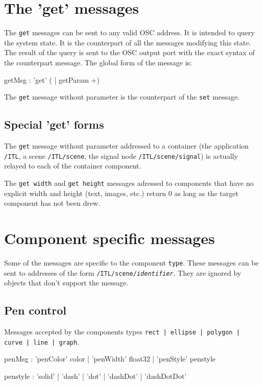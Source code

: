 \documentclass[a4paper,twoside]{report}
\newcommand{\toplevel}[1]	{\chapter{#1}}
\newcommand{\sublevel}[1]	{\section{#1}}
\newcommand{\OSC}[1]		{\texttt{#1}}
\begin{document}
\toplevel{The 'get' messages}
\label{getsect}

The \OSC{get} messages can be sent to any valid OSC address. It is intended to query the system state. It is the counterpart of all the messages modifying this state.  The result of the query is sent to the OSC output port with the exact syntax of the counterpart message. 
The global form of the message is:
\begin{rail}
getMsg : 'get' ( | getParam +)
\end{rail}

The \OSC{get} message without parameter is the counterpart of the \OSC{set} message. 

\sublevel{Special 'get' forms}

The \OSC{get} message without parameter addressed to a container (the application \OSC{/ITL}, a scene \OSC{/ITL/scene}, the signal node \OSC{/ITL/scene/signal}) is actually relayed to each of the container component.  

The \OSC{get width} and \OSC{get height} messages adressed to components that have no explicit width and height (text, images, etc.) return 0 as long as the target component has not been drew.



\toplevel{Component specific messages}
\label{specificMsg}
Some of the messages are specific to the component \OSC{type}. These messages can be sent to addresses of the form \OSC{/ITL/scene/\textit{identifier}}. They are ignored by objects that don't support the message. 

\sublevel{Pen control}

Messages accepted by the components types \OSC{rect | ellipse | polygon | curve | line | graph}.
\begin{rail}
penMsg : 	  'penColor' color 
			| 'penWidth' float32
			| 'penStyle' penstyle
\end{rail}

\begin{rail}
penstyle : 'solid' | 'dash' | 'dot' | 'dashDot' | 'dashDotDot'
\end{rail}
\end{document}
